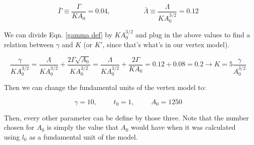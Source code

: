 \documentclass[12pt]{article}
\begin{document}
\begin{center}
\begin{equation}
\bar{\Gamma} \equiv \frac{\Gamma}{K A_0} = 0.04, \hspace{2cm} \bar{\Lambda} \equiv \frac{\Lambda}{K A_0^{3/2}} = 0.12
\end{equation}
\end{center}
We can divide Eqn. \ref{gamma def} by $K A_0^{3/2}$ and plug in the above values to find a relation between $\gamma$ and $K$ (or $K'$, since that's what's in our vertex model). 
\begin{center}
\begin{equation}
\frac{\gamma}{K A_0^{3/2}} = \frac{\Lambda}{ K A_0^{3/2}} + \frac{2 \Gamma \sqrt{A_0}}{ K A_0^{3/2}} = \frac{\Lambda}{ K A_0^{3/2}} + \frac{2 \Gamma}{ K A_0} = 0.12 + 0.08 = 0.2 \rightarrow K = 5 \frac{\gamma}{A_0^{3/2}}
\end{equation}
\end{center}
Then we can change the fundamental units of the vertex model to:
\begin{center}
\begin{equation}
\gamma = 10, \hspace{1cm} t_0 = 1, \hspace{1cm} A_0 = 1250
\end{equation}
\end{center}
Then, every other parameter can be define by those three. Note that the number chosen for $A_0$ is simply the value that $A_0$ would have when it was calculated using $l_0$ as a fundamental unit of the model.
\end{document}
